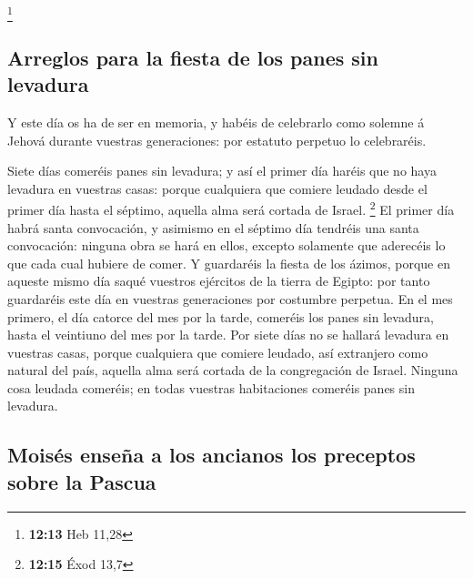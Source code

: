 \footnote{\textbf{12:13} Heb 11,28}

\hypertarget{arreglos-para-la-fiesta-de-los-panes-sin-levadura}{%
\subsection{Arreglos para la fiesta de los panes sin
levadura}\label{arreglos-para-la-fiesta-de-los-panes-sin-levadura}}

 Y este día os ha de ser en memoria, y habéis de
celebrarlo como solemne á Jehová durante vuestras generaciones: por
estatuto perpetuo lo celebraréis.

 Siete días comeréis panes sin levadura; y así el primer
día haréis que no haya levadura en vuestras casas: porque cualquiera que
comiere leudado desde el primer día hasta el séptimo, aquella alma será
cortada de Israel. \footnote{\textbf{12:15} Éxod 13,7} 
El primer día habrá santa convocación, y asimismo en el séptimo día
tendréis una santa convocación: ninguna obra se hará en ellos, excepto
solamente que aderecéis lo que cada cual hubiere de comer.
 Y guardaréis la fiesta de los ázimos, porque en aqueste
mismo día saqué vuestros ejércitos de la tierra de Egipto: por tanto
guardaréis este día en vuestras generaciones por costumbre perpetua.
 En el mes primero, el día catorce del mes por la tarde,
comeréis los panes sin levadura, hasta el veintiuno del mes por la
tarde.  Por siete días no se hallará levadura en vuestras
casas, porque cualquiera que comiere leudado, así extranjero como
natural del país, aquella alma será cortada de la congregación de
Israel.  Ninguna cosa leudada comeréis; en todas vuestras
habitaciones comeréis panes sin levadura.

\hypertarget{moisuxe9s-enseuxf1a-a-los-ancianos-los-preceptos-sobre-la-pascua}{%
\subsection{Moisés enseña a los ancianos los preceptos sobre la
Pascua}\label{moisuxe9s-enseuxf1a-a-los-ancianos-los-preceptos-sobre-la-pascua}}


